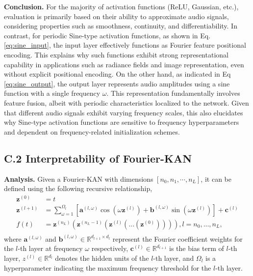 \documentclass[letterpaper]{article} %
\begin{document}
\textbf{Conclusion.}
For the majority of activation functions (ReLU, Gaussian, etc.), evaluation is primarily based on their ability to approximate audio signals, considering properties such as smoothness, continuity, and differentiability. In contrast, for periodic Sine-type activation functions, as shown in Eq. \ref{eq:sine_input}, the input layer effectively functions as Fourier feature positional encoding. This explains why such functions exhibit strong representational capability in applications such as radiance fields and image representation, even without explicit positional encoding. On the other hand, as indicated in Eq \ref{eq:sine_output}, the output layer represents audio amplitudes using a sine function with a single frequency \(\omega\). This representation fundamentally involves feature fusion, albeit with periodic characteristics localized to the network. Given that different audio signals exhibit varying frequency scales, this also elucidates why Sine-type activation functions are sensitive to frequency hyperparameters and dependent on frequency-related initialization schemes.

\subsection{C.2 Interpretability of Fourier-KAN}
\textbf{Analysis.} Given a Fourier-KAN with dimensions \([n_0, n_1, \cdots, n_L]\), it can be defined using the following recursive relationship,
\begin{equation*}
\begin{aligned}
    \mathbf{z}^{(0)} & = {t} \\
    \mathbf{z}^{(l+1)} &= \sum_{\omega=1}^{\Omega_l} \left[ \mathbf{a}^{(l,\omega)}\cos(\omega \mathbf{z}^{(l)}) + \mathbf{b}^{(l,\omega)}\sin(\omega \mathbf{z}^{(l)})\right] + \mathbf{c}^{(l)} \\
    f({t}) & = \mathbf{z}^{(n_L)}\left(\mathbf{z}^{(n_L-1)}\left(\mathbf{z}^{(l)}\left(...(\mathbf{z}^{(0)})\right)\right)\right), l=n_0, \ldots, n_L, \\
\end{aligned}
\end{equation*}  where \(\mathbf{a}^{(l, \omega)}\) and \(\mathbf{b}^{(l, \omega)} \in \mathbb{R}^{d_{l+1} \times d_l}\) represent the Fourier coefficient weights for the \(l\)-th layer at frequency \(\omega\) respectively, \(\mathbf{c}^{(l)} \in \mathbb{R}^{d_{l+1}}\) is the bias term of $l$-th layer, \(z^{(l)} \in \mathbb{R}^{d_l}\) denotes the hidden units of the \(l\)-th layer, and \(\Omega_l\) is a hyperparameter indicating the maximum frequency threshold for the \(l\)-th layer.
\end{document}
